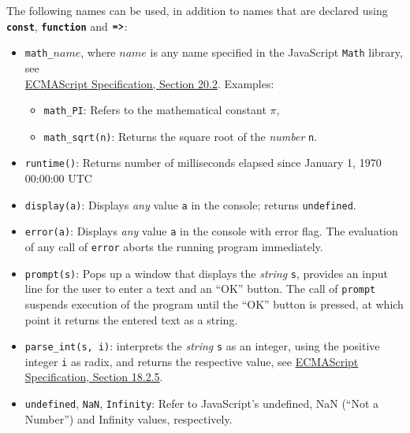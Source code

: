 The following names can be used, in addition to names that
are declared using \texttt{\textbf{const}}, \texttt{\textbf{function}} and
$\texttt{\textbf{=>}}$:
\begin{itemize}
\item \lstinline{math_}$\textit{name}$,
where $\textit{name}$ is any name specified in the
JavaScript
\texttt{Math} library, see\\
\href{https://www.ecma-international.org/ecma-262/8.0/index.html#sec-math-object}{\color{DarkBlue}ECMAScript Specification, Section 20.2}. Examples:
\begin{itemize}
\item \verb#math_PI#: Refers to the mathematical constant $\pi$,
\item \verb#math_sqrt#\texttt{(n)}: Returns the square root of the \emph{number} \texttt{n}.
\end{itemize}
\item \texttt{runtime()}: Returns number of milliseconds elapsed since January 1, 1970 00:00:00 UTC
\item \texttt{display(a)}: Displays \emph{any} value \texttt{a} in the console; returns \texttt{undefined}.
\item \texttt{error(a)}: Displays \emph{any} value \texttt{a} in the console with error flag. The evaluation
  of any call of \texttt{error} aborts the running program immediately.
\item \texttt{prompt(s)}: Pops up a window that displays the \emph{string} \texttt{s}, provides
an input line for the user to enter a text and an ``OK'' button. The call of \texttt{prompt}
suspends execution of the program until the ``OK'' button is pressed, at which point it
returns the entered text as a string.
\item \verb#parse_int#\texttt{(s, i)}:
interprets the \emph{string} \texttt{s} as an integer, using the positive integer \texttt{i} as radix, and returns the respective value,
see \href{https://www.ecma-international.org/ecma-262/8.0/index.html#sec-parseint-string-radix}{\color{DarkBlue}ECMAScript Specification, Section 18.2.5}.
\item \verb#undefined#, \verb#NaN#, \verb#Infinity#: Refer to JavaScript's undefined,
NaN (``Not a Number'') and Infinity values, respectively.
\end{itemize}
